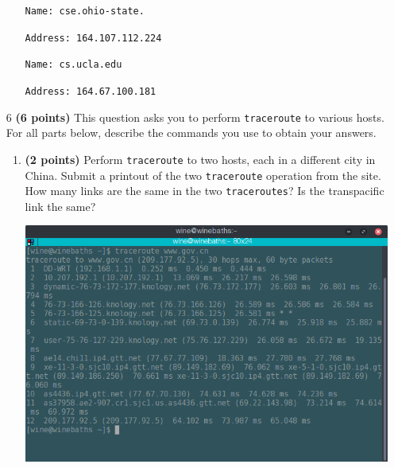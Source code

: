 \documentclass{article}
\begin{document}
\begin{enumerate}
\begin{enumerate}
\texttt{Name: cse.ohio-state.}

\texttt{Address: 164.107.112.224}


\texttt{Name: cs.ucla.edu}

\texttt{Address: 164.67.100.181}


\end{enumerate}

\item[6]\textbf{(6 points)} This question asks you to perform \texttt{traceroute} to various hosts. For all parts below, describe the commands you use to obtain your answers.

\begin{enumerate}
\item \textbf{(2 points)} Perform \texttt{traceroute} to two hosts, each in a different city in China. Submit a printout of the two \texttt{traceroute} operation from the site. How many links are the same in the two \texttt{traceroutes}? Is the transpacific link the same?

\includegraphics[scale=0.5]{cn1.png}


\end{enumerate}
\end{enumerate}
\end{document}
